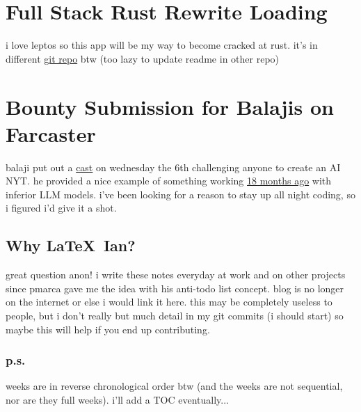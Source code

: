 \newpage
\section{Full Stack Rust Rewrite Loading}
i love leptos so this app will be my way to become cracked at rust. it's in
different 
\textcolor{blue}{\href{https://github.com/iturner72/thenetworktimes}{git repo}}
btw (too lazy to update readme in other repo)

\newpage
\section{Bounty Submission for Balajis on Farcaster}

balaji put out a
\textcolor{purple}{\href{https://warpcast.com/balajis.eth/0x218b92a7}{cast}} on
wednesday the 6th challenging anyone to create an AI NYT. he provided a nice
example of something working
\textcolor{blue}{\href{https://twitter.com/balajis/status/1601398685106991105?s=46}{18
months ago}} with inferior LLM models. i've been looking for a reason to stay up
all night coding, so i figured i'd give it a shot.


\subsection*{Why \LaTeX\ Ian?}
great question anon! i write these notes everyday at work and on other projects
since pmarca gave me the idea with his anti-todo list concept. blog is no longer
on the internet or else i would link it here. this may be completely useless to
people, but i don't really but much detail in my git commits (i should start) so
maybe this will help if you end up contributing.

\subsubsection*{p.s.}
weeks are in reverse chronological order btw (and the weeks are not sequential,
nor are they full weeks). i'll add a TOC eventually...
